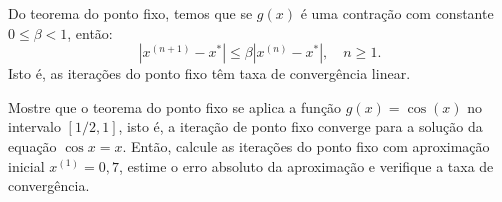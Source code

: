 \begin{obs}
  Do teorema do ponto fixo, temos que se $g(x)$ é uma contração com constante $0\leq \beta < 1$, então:
  \begin{equation}
    |x^{(n+1)}-x^*| \leq \beta |x^{(n)}-x^*|,\quad n\geq 1.
  \end{equation}
Isto é, as iterações do ponto fixo têm taxa de convergência linear.
\end{obs}

\begin{ex}\label{ex:ponto_fixo_3}
Mostre que o teorema do ponto fixo se aplica a função $g(x) = \cos(x)$ no intervalo $[1/2, 1]$, isto é, a iteração de ponto fixo converge para a solução da equação $\cos x = x$. Então, calcule as iterações do ponto fixo com aproximação inicial $x^{(1)} = 0,7$, estime o erro absoluto da aproximação e verifique a taxa de convergência.
\end{ex}
